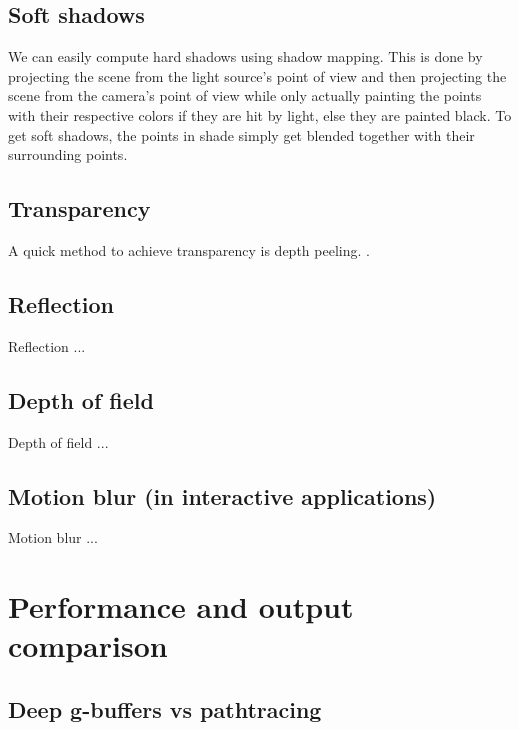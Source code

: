 \documentclass{ACGSeminar}
\begin{document}
	\subsection{Soft shadows}
		We can easily compute hard shadows using shadow mapping. This is done by projecting the scene from the light source's point of view and then projecting the scene from the camera's point of view while only actually painting the points with their respective colors if they are hit by light, else they are painted black. To get soft shadows, the points in shade simply get blended together with their surrounding points.
	\subsection{Transparency}
		A quick method to achieve transparency is depth peeling. \cite{NOIT}.

	\subsection{Reflection}
		Reflection ...

	\subsection{Depth of field}
		Depth of field ...

	\subsection{Motion blur (in interactive applications)}
		Motion blur ...

\section{Performance and output comparison}
	\subsection{Deep g-buffers vs pathtracing}

\printbibliography
\end{document}

